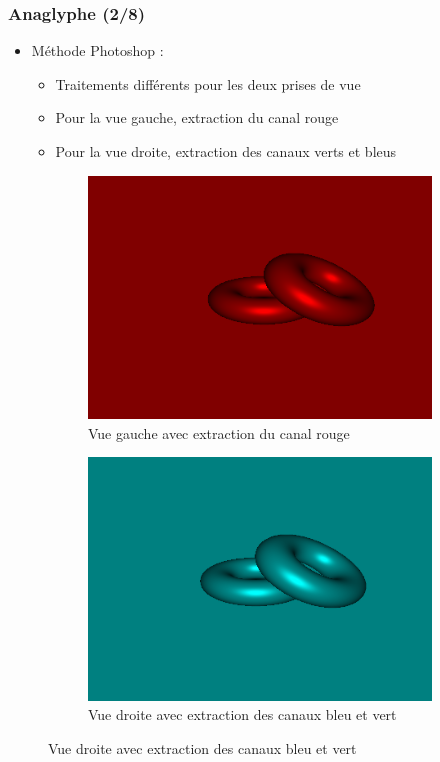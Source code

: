 \documentclass{beamer}
\begin{document}
%
\begin{frame}
\frametitle{Anaglyphe (2/8)}
\begin{itemize}[label=$\bullet$]
\item Méthode Photoshop \cite{stereoAnaglyph} : 
	\begin{itemize}[label=$\circ$] 
	\item Traitements différents pour les deux prises de vue
	\item Pour la vue gauche, extraction du canal rouge
	\item Pour la vue droite, extraction des canaux verts et bleus
	\end{itemize}
\end{itemize}
\begin{figure}
\centering
\caption{Les deux vues rouge et cyan}
\begin{subfigure}{.5\textwidth}
  \centering
  \includegraphics[width=.8\linewidth]{gauche_rouge.png}
  \caption{Vue gauche avec extraction du canal rouge}
\end{subfigure}%
\begin{subfigure}{.5\textwidth}
  \centering
  \includegraphics[width=.8\linewidth]{droite_cyan.png}
  \caption{Vue droite avec extraction des canaux bleu et vert}
\end{subfigure}
\end{figure}


	\end{frame}
\end{document}
